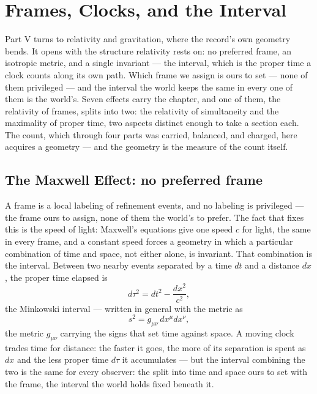 \chapter{Frames, Clocks, and the Interval}
\label{chap:frames-clocks-interval}

Part V turns to relativity and gravitation, where the record's own geometry bends. It opens with the structure
relativity rests on: no preferred frame, an isotropic metric, and a single invariant --- the interval, which
is the proper time a clock counts along its own path. Which frame we assign is ours to set --- none of them
privileged --- and the interval the world keeps the same in every one of them is the world's. Seven effects
carry the chapter, and one of them, the relativity of frames, splits into two: the relativity of simultaneity
and the maximality of proper time, two aspects distinct enough to take a section each. The count, which through four parts was carried, balanced, and
charged, here acquires a geometry --- and the geometry is the measure of the count itself.

\section{The Maxwell Effect: no preferred frame}
\label{se:maxwell-relativity}

A frame is a local labeling of refinement events, and no labeling is privileged --- the frame ours to assign,
none of them the world's to prefer. The fact that fixes this is the speed of light: Maxwell's equations give one
speed $c$ for light, the same in every frame, and a constant
speed forces a geometry in which a particular combination of time and space, not either alone, is invariant.
That combination is the interval. Between two nearby events separated by a time $dt$ and a distance $dx$, the
proper time elapsed is
\begin{equation}
  d\tau^2 = dt^2 - \frac{dx^2}{c^2},
\end{equation}
the Minkowski interval --- written in general with the metric as
\begin{equation}
  s^2 = g_{\mu\nu}\, dx^\mu dx^\nu,
\end{equation}
the metric $g_{\mu\nu}$ carrying the signs that set time against space. A moving clock trades time for distance:
the faster it goes, the more of its separation is spent as $dx$ and the less proper time $d\tau$ it
accumulates --- but the interval combining the two is the same for every observer: the split into time and
space ours to set with the frame, the interval the world holds fixed beneath it.

